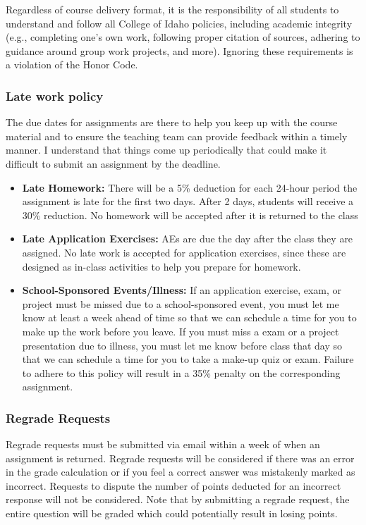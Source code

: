 \documentclass[
  letterpaper,
  DIV=11,
  numbers=noendperiod]{scrartcl}
\begin{document}
Regardless of course delivery format, it is the responsibility of all
students to understand and follow all College of Idaho policies,
including academic integrity (e.g., completing one's own work, following
proper citation of sources, adhering to guidance around group work
projects, and more). Ignoring these requirements is a violation of the
Honor Code.

\subsubsection{Late work policy}\label{late-work-policy}

The due dates for assignments are there to help you keep up with the
course material and to ensure the teaching team can provide feedback
within a timely manner. I understand that things come up periodically
that could make it difficult to submit an assignment by the deadline.

\begin{itemize}
\item
  \textbf{Late Homework:} There will be a 5\% deduction for each 24-hour
  period the assignment is late for the first two days. After 2 days,
  students will receive a 30\% reduction. No homework will be accepted
  after it is returned to the class
\item
  \textbf{Late Application Exercises:} AEs are due the day after the
  class they are assigned. No late work is accepted for application
  exercises, since these are designed as in-class activities to help you
  prepare for homework.
\item
  \textbf{School-Sponsored Events/Illness:} If an application exercise,
  exam, or project must be missed due to a school-sponsored event, you
  must let me know at least a week ahead of time so that we can schedule
  a time for you to make up the work before you leave. If you must miss
  a exam or a project presentation due to illness, you must let me know
  before class that day so that we can schedule a time for you to take a
  make-up quiz or exam. Failure to adhere to this policy will result in
  a 35\% penalty on the corresponding assignment.
\end{itemize}

\subsubsection{Regrade Requests}\label{regrade-requests}

Regrade requests must be submitted via email within a week of when an
assignment is returned. Regrade requests will be considered if there was
an error in the grade calculation or if you feel a correct answer was
mistakenly marked as incorrect. Requests to dispute the number of points
deducted for an incorrect response will not be considered. Note that by
submitting a regrade request, the entire question will be graded which
could potentially result in losing points.
\end{document}
